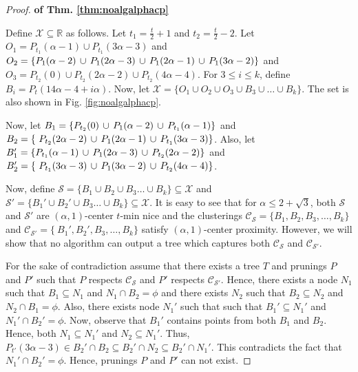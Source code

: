 \documentclass[anon,12pt]{colt2016} %
\newcommand{\mc}{\mathcal}
\begin{document}
\begin{proof}\textbf{ of Thm. \ref{thm:noalgalphacp}}

Define $\mc X \subseteq \mathbb{R}$ as follows. Let $t_1 = \frac{t}{2}+1$ and $t_2 = \frac{t}{2}-2$. Let $O_1 = P_{t_1}(\alpha-1)\cup P_{t_1}(3\alpha-3)$ and $O_2 = \{P_{1}(\alpha-2) \thinspace\cup\thinspace P_{1}(2\alpha-3) \thinspace\cup\thinspace P_{1}(2\alpha-1) \thinspace\cup\thinspace P_{1}(3\alpha-2)\}$ and $O_3 = P_{t_2}(0)\cup P_{t_2}(2\alpha-2)\cup P_{t_2}(4\alpha-4)$. For $3\le i\le k$, define $B_i = P_t(14\alpha-4+i\alpha)$. Now, let $\mc X = \{O_1 \cup O_2 \cup O_3\cup B_3 \cup \ldots \cup B_k\}$. The set is also shown in Fig. \ref{fig:noalgalphacp}.

Now, let $B_1 = \{P_{t_2}(0) \thinspace\cup\thinspace  P_{1}(\alpha-2) \thinspace\cup\thinspace P_{t_1}(\alpha-1) \}$ and $B_2 = \{\ P_{t_2}(2\alpha-2) \thinspace\cup\thinspace P_{1}(2\alpha-1)\thinspace\cup\thinspace P_{t_1}(3\alpha-3)\}$. Also, let $B_1' = \{P_{t_1}(\alpha-1) \thinspace\cup\thinspace  P_{1}(2\alpha-3) \thinspace\cup\thinspace P_{t_2}(2\alpha-2) \}$ and $B_2' = \{\ P_{t_1}(3\alpha-3) \thinspace\cup\thinspace P_{1}(3\alpha-2)\thinspace\cup\thinspace P_{t_2}(4\alpha-4)\}$. 

Now, define $\mc S = \{B_1 \cup B_2 \cup B_3\ldots \cup B_k\} \subseteq \mc X$ and $\mc S' = \{B_1' \cup B_2' \cup B_3\ldots \cup B_k\} \subseteq \mc X$. It is easy to see that for $\alpha \le 2+\sqrt{3}$, both $\mc S$ and $\mc S'$ are $(\alpha, 1)$-center $t$-min nice and the clusterings $\mc C_{\mc S} = \{B_1, B_2, B_3, \ldots, B_k\}$ and $\mc C_{\mc S'} = \{\ B_1', B_2', B_3, \ldots, B_k\}$ satisfy $(\alpha, 1)$-center proximity. However, we will show that no algorithm can output a tree which captures both $\mc C_{\mc S}$ and $\mc C_{\mc S'}$.

For the sake of contradiction assume that there exists a tree $T$ and prunings $P$ and $P'$ such that $P$ respects $\mc C_{\mc S}$ and $P'$ respects $\mc C_{\mc S'}$. Hence, there exists a node $N_1$ such that $B_1 \subseteq N_1$ and $N_1 \cap B_2 = \phi$ and there exists $N_2$ such that $B_2 \subseteq N_2$ and $N_2 \cap B_1 = \phi$. Also, there exists node $N_1'$ such that such that $B_1' \subseteq N_1'$ and $N_1' \cap B_2' = \phi$. Now, observe that $B_1'$ contains points from both $B_1$ and $B_2$. Hence, both $N_1 \subseteq N_1'$ and $N_2 \subseteq N_1'$. Thus, $P_{t'}(3\alpha-3)\in B_2'\cap B_2 \subseteq B_2' \cap N_2 \subseteq B_2' \cap N_1'$. This contradicts the fact that $N_1' \cap B_2' = \phi$. Hence, prunings $P$ and $P'$ can not exist.
\end{proof}
\end{document}
